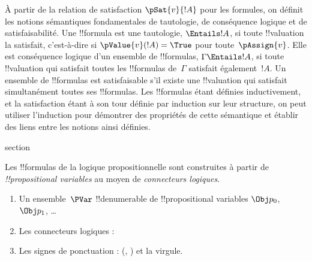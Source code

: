 \documentclass[11pt,a4paper,openany]{memoir}
\begin{document}
À partir de la relation de satisfaction $\pSat{v}{!A}$ pour les
formules, on définit les notions sémantiques fondamentales de
tautologie, de conséquence logique et de satisfaisabilité.
Une !!{formula} est une tautologie, $\Entails !A$, si toute
!!{valuation} la satisfait, c'est-à-dire si $\pValue{v}(!A) = \True$
pour toute~$\pAssign{v}$. Elle est conséquence logique d'un ensemble
de !!{formula}s, $\Gamma \Entails !A$, si toute !!{valuation} qui
satisfait toutes les !!{formula}s de~$\Gamma$ satisfait également~$!A$.
Un ensemble de !!{formula}s est satisfaisable s'il existe une
!!{valuation} qui satisfait simultanément toutes ses !!{formula}s.
Les !!{formula}s étant définies inductivement, et la satisfaction
étant à son tour définie par induction sur leur structure, on peut
utiliser l'induction pour démontrer des propriétés de cette sémantique
et établir des liens entre les notions ainsi définies.


\endgroup



\begingroup
\expandafter\def\csname ol@sectioncs\endcsname{section}
\def\olfilename{formulas}




Les !!{formula}s de la logique propositionnelle sont construites à
partir de \emph{!!{propositional variable}s}%
%
 au moyen de \emph{connecteurs logiques}.

\begin{enumerate}
\item Un ensemble~$\PVar$ !!{denumerable} de
  !!{propositional variable}s $\Obj p_0$, $\Obj p_1$, \dots
{}
\item Les connecteurs logiques :
  \startycommalist
\item Les signes de ponctuation : (, ) et la virgule.
\end{enumerate}
\end{document}
